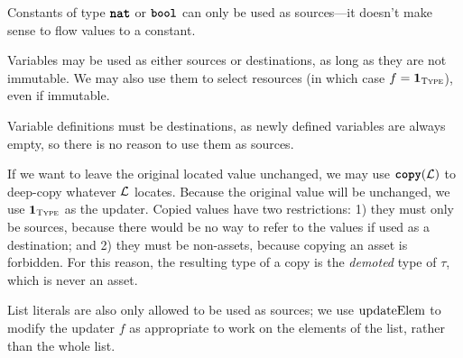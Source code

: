 \documentclass[nonacm, dvipsnames, sigconf]{acmart}
\begin{document}
Constants of type $\natt$ or $\boolt$ can only be used as sources---it doesn't make sense to flow values to a constant.
\begin{mathpar}

\end{mathpar}

Variables may be used as either sources or destinations, as long as they are not immutable.
We may also use them to select resources (in which case $f = \id{\types}$), even if immutable.
\begin{mathpar}
\end{mathpar}

Variable definitions must be destinations, as newly defined variables are always empty, so there is no reason to use them as sources.
\begin{mathpar}
\end{mathpar}

If we want to leave the original located value unchanged, we may use $\copyC(\Loc)$ to deep-copy whatever $\Loc$ locates.
Because the original value will be unchanged, we use $\id{\types}$ as the updater.
Copied values have two restrictions: 1) they must only be sources, because there would be no way to refer to the values if used as a destination; and 2) they must be non-assets, because copying an asset is forbidden.
For this reason, the resulting type of a copy is the \emph{demoted} type of $\tau$, which is never an asset.
\begin{mathpar}

\end{mathpar}

List literals are also only allowed to be used as sources; we use $\updateElem$ to modify the updater $f$ as appropriate to work on the elements of the list, rather than the whole list.
\begin{mathpar}
\end{mathpar}
\end{document}

